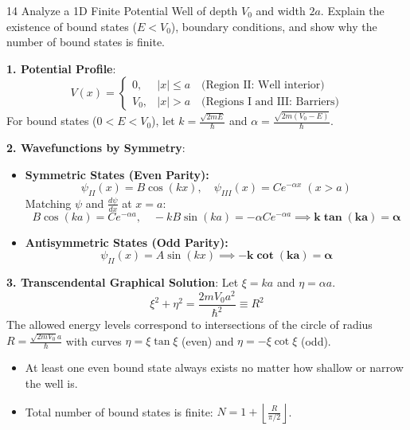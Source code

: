 \begin{theoryq}{14}
Analyze a 1D Finite Potential Well of depth $V_0$ and width $2a$. Explain the existence of bound states ($E < V_0$), boundary conditions, and show why the number of bound states is finite.
\end{theoryq}
\begin{theorysol}
\textbf{1. Potential Profile}:
\begin{equation}
V(x) = \begin{cases} 0, & |x| \le a \quad \text{(Region II: Well interior)} \\ V_0, & |x| > a \quad \text{(Regions I and III: Barriers)} \end{cases}
\end{equation}
For bound states ($0 < E < V_0$), let $k = \frac{\sqrt{2mE}}{\hbar}$ and $\alpha = \frac{\sqrt{2m(V_0 - E)}}{\hbar}$.

\textbf{2. Wavefunctions by Symmetry}:
\begin{itemize}
\item \textbf{Symmetric States (Even Parity):}
\begin{equation}
\psi_{II}(x) = B \cos(kx),\quad \psi_{III}(x) = C e^{-\alpha x}\; (x > a)
\end{equation}
Matching $\psi$ and $\frac{d\psi}{dx}$ at $x = a$:
\begin{equation}
B\cos(ka) = C e^{-\alpha a},\quad -kB\sin(ka) = -\alpha C e^{-\alpha a} \implies \mathbf{k \tan(ka) = \alpha}
\end{equation}
\item \textbf{Antisymmetric States (Odd Parity):}
\begin{equation}
\psi_{II}(x) = A \sin(kx) \implies \mathbf{-k \cot(ka) = \alpha}
\end{equation}
\end{itemize}

\textbf{3. Transcendental Graphical Solution}:
Let $\xi = ka$ and $\eta = \alpha a$.
\begin{equation}
\xi^2 + \eta^2 = \frac{2m V_0 a^2}{\hbar^2} \equiv R^2
\end{equation}
The allowed energy levels correspond to intersections of the circle of radius $R = \frac{\sqrt{2mV_0}a}{\hbar}$ with curves $\eta = \xi \tan\xi$ (even) and $\eta = -\xi \cot\xi$ (odd).
\begin{itemize}
\item At least one even bound state always exists no matter how shallow or narrow the well is.
\item Total number of bound states is finite: $N = 1 + \left\lfloor \frac{R}{\pi/2} \right\rfloor$.
\end{itemize}

\end{theorysol}
\vspace{4mm}

